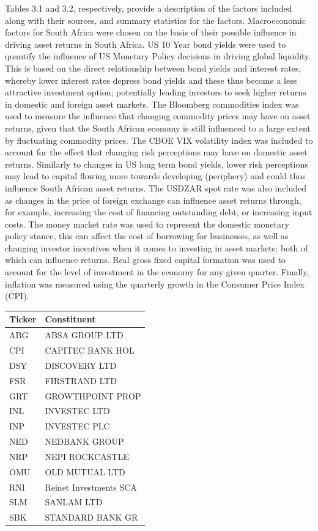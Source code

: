 \documentclass[11pt,preprint, authoryear]{elsarticle}
\let\origtable\table
\let\endorigtable\endtable
\renewenvironment{table}[1][2] {
    \expandafter\origtable\expandafter[H]
} {
    \endorigtable
}
\numberwithin{equation}{section}
\numberwithin{figure}{section}
\numberwithin{table}{section}
\begin{document}
Tables 3.1 and 3.2, respectively, provide a description of the factors
included along with their sources, and summary statistics for the
factors. Macroeconomic factors for South Africa were chosen on the basis
of their possible influence in driving asset returns in South Africa. US
10 Year bond yields were used to quantify the influence of US Monetary
Policy decisions in driving global liquidity. This is based on the
direct relationship between bond yields and interest rates, whereby
lower interest rates depress bond yields and these thus become a less
attractive investment option; potentially leading investors to seek
higher returns in domestic and foreign asset markets. The Bloomberg
commodities index was used to measure the influence that changing
commodity prices may have on asset returns, given that the South African
economy is still influenced to a large extent by fluctuating commodity
prices. The CBOE VIX volatility index was included to account for the
effect that changing risk perceptions may have on domestic asset
returns. Similarly to changes in US long term bond yields, lower risk
perceptions may lead to capital flowing more towards developing
(periphery) and could thus influence South African asset returns. The
USDZAR spot rate was also included as changes in the price of foreign
exchange can influence asset returns through, for example, increasing
the cost of financing outstanding debt, or increasing input costs. The
money market rate was used to represent the domestic monetary policy
stance, this can affect the cost of borrowing for businesses, as well as
changing investor incentives when it comes to investing in asset
markets; both of which can influence returns. Real gross fixed capital
formation was used to account for the level of investment in the economy
for any given quarter. Finally, inflation was measured using the
quarterly growth in the Consumer Price Index (CPI).

\begin{table}[H]

\caption{\label{tab:T40 constituents}T40 Constituents: Financials}
\centering
\begin{tabular}[t]{l|l}
\hline
Ticker & Constituent\\
\hline
ABG & ABSA GROUP LTD\\
\hline
CPI & CAPITEC BANK HOL\\
\hline
DSY & DISCOVERY LTD\\
\hline
FSR & FIRSTRAND LTD\\
\hline
GRT & GROWTHPOINT PROP\\
\hline
INL & INVESTEC LTD\\
\hline
INP & INVESTEC PLC\\
\hline
NED & NEDBANK GROUP\\
\hline
NRP & NEPI ROCKCASTLE\\
\hline
OMU & OLD MUTUAL LTD\\
\hline
RNI & Reinet Investments SCA\\
\hline
SLM & SANLAM LTD\\
\hline
SBK & STANDARD BANK GR\\
\hline
\end{tabular}
\end{table}
\end{document}

